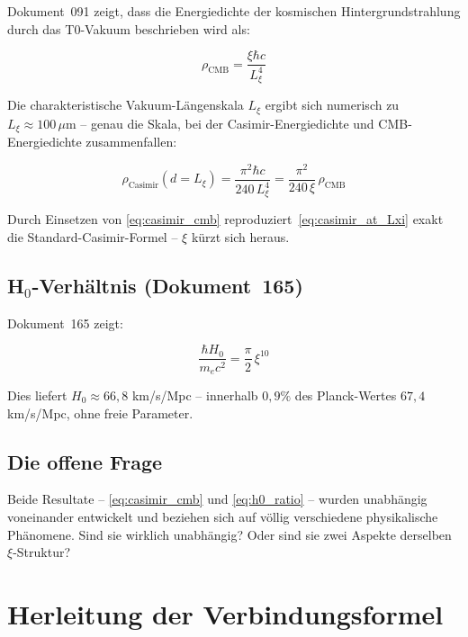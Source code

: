 Dokument~091 zeigt, dass die Energiedichte der kosmischen Hintergrundstrahlung
durch das T0-Vakuum beschrieben wird als:

\begin{equation}
    \rho_\text{CMB} = \frac{\xi \hbar c}{L_\xi^4}
    \label{eq:casimir_cmb}
\end{equation}

Die charakteristische Vakuum-Längenskala $L_\xi$ ergibt sich numerisch zu
$L_\xi \approx 100\,\mu\text{m}$ -- genau die Skala, bei der Casimir-Energiedichte
und CMB-Energiedichte zusammenfallen:

\begin{equation}
    \rho_\text{Casimir}(d = L_\xi)
    = \frac{\pi^2 \hbar c}{240\,L_\xi^4}
    = \frac{\pi^2}{240\,\xi}\,\rho_\text{CMB}
    \label{eq:casimir_at_Lxi}
\end{equation}

Durch Einsetzen von \eqref{eq:casimir_cmb} reproduziert~\eqref{eq:casimir_at_Lxi}
exakt die Standard-Casimir-Formel -- $\xi$ kürzt sich heraus.

\subsection{H\texorpdfstring{$_0$}{0}-Verhältnis (Dokument~165)}

Dokument~165 zeigt:

\begin{equation}
    \frac{\hbar H_0}{m_e c^2} = \frac{\pi}{2}\,\xi^{10}
    \label{eq:h0_ratio}
\end{equation}

Dies liefert $H_0 \approx 66{,}8$ km/s/Mpc -- innerhalb $0{,}9\%$ des
Planck-Wertes $67{,}4$ km/s/Mpc, ohne freie Parameter.

\subsection{Die offene Frage}

Beide Resultate -- \eqref{eq:casimir_cmb} und \eqref{eq:h0_ratio} -- wurden
unabhängig voneinander entwickelt und beziehen sich auf völlig verschiedene
physikalische Phänomene. Sind sie wirklich unabhängig? Oder sind sie zwei
Aspekte derselben $\xi$-Struktur?

\section{Herleitung der Verbindungsformel}
\label{sec:herleitung}

